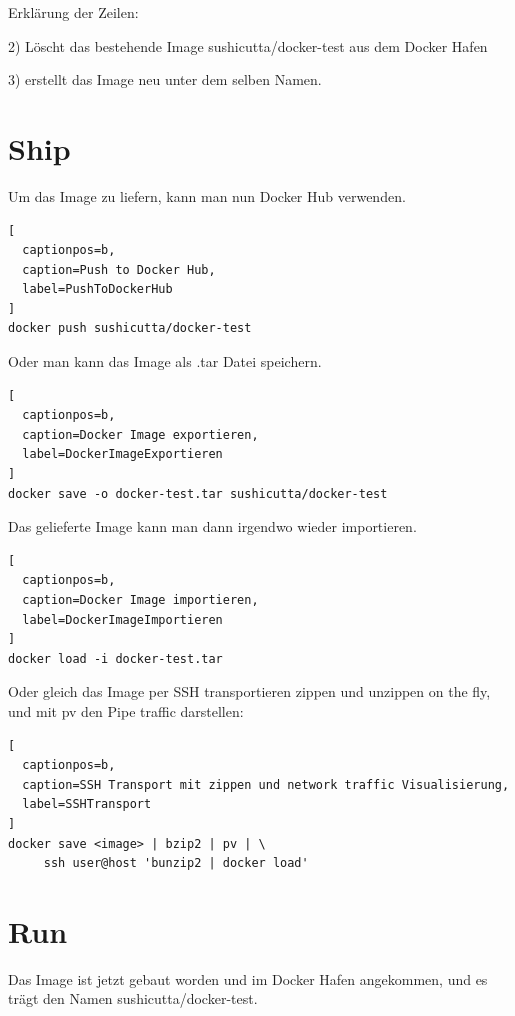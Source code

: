 Erklärung der Zeilen:

2) Löscht das bestehende Image sushicutta/docker-test aus dem Docker Hafen

3) erstellt das Image neu unter dem selben Namen.

\section{Ship}

Um das Image zu liefern, kann man nun Docker Hub verwenden.
\\

\begin{lstlisting}[
  captionpos=b,
  caption=Push to Docker Hub,
  label=PushToDockerHub
]
docker push sushicutta/docker-test
\end{lstlisting}

Oder man kann das Image als .tar Datei speichern.
\\

\begin{lstlisting}[
  captionpos=b,
  caption=Docker Image exportieren,
  label=DockerImageExportieren
]
docker save -o docker-test.tar sushicutta/docker-test
\end{lstlisting}

Das gelieferte Image kann man dann irgendwo wieder importieren.
\\

\begin{lstlisting}[
  captionpos=b,
  caption=Docker Image importieren,
  label=DockerImageImportieren
]
docker load -i docker-test.tar
\end{lstlisting}

Oder gleich das Image per SSH transportieren zippen und unzippen on the fly, und mit pv den
Pipe traffic darstellen:
\\

\begin{lstlisting}[
  captionpos=b,
  caption=SSH Transport mit zippen und network traffic Visualisierung,
  label=SSHTransport
]
docker save <image> | bzip2 | pv | \
     ssh user@host 'bunzip2 | docker load'
\end{lstlisting}

\section{Run}

Das Image ist jetzt gebaut worden und im Docker Hafen angekommen, und es trägt den Namen
sushicutta/docker-test.

